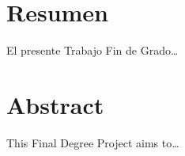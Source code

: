 \section*{Resumen}
El presente Trabajo Fin de Grado\dots
\vspace{0.5cm}

\section*{Abstract}
This Final Degree Project aims to\dots

\newpage
